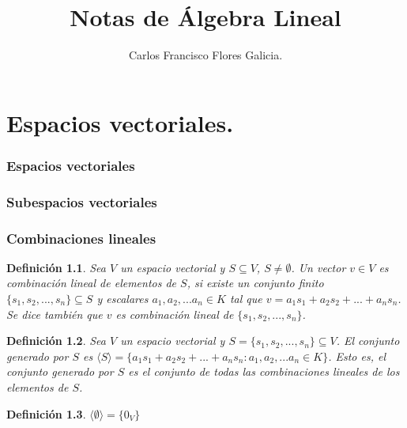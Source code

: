 \documentclass{book}
\title{Notas de Álgebra Lineal}
\author{Carlos Francisco Flores Galicia.}
\date{}
\newtheorem{definition}{Definición}
\begin{document}
\maketitle

\chapter{Espacios vectoriales.}
\subsection{Espacios vectoriales}
\subsection{Subespacios vectoriales}
\subsection{Combinaciones lineales}

\begin{definition}
Sea $V$ un espacio vectorial y $S \subseteq V$, $S \neq \emptyset$. Un vector $v \in V$ es combinación lineal de elementos de $S$, si existe un conjunto finito $\{s_1,s_2,...,s_n\}\subseteq S$ y escalares $a_1,a_2,...a_n \in K$ tal que $v=a_1 s_1+a_2 s_2+...+a_n s_n$. Se dice también que $v$ es combinación lineal de $\{s_1,s_2,...,s_n\}$.
\end{definition}

\begin{definition}
Sea $V$ un espacio vectorial y $S=\{ s_1,s_2,...,s_n \} \subseteq V$. El conjunto generado por $S$ es $\langle S \rangle = \{a_1 s_1+a_2 s_2+...+a_n s_n : a_1,a_2,...a_n \in K \}$. Esto es, el conjunto generado por $S$ es el conjunto de todas las combinaciones lineales de los elementos de $S$.
\end{definition}

\begin{definition}
$\langle \emptyset \rangle=\{0_V\}$
\end{definition}
\end{document}
